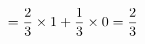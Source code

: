 \documentclass[preview]{standalone}
\begin{document}
\begin{align*}
\special{dvisvgm:raw <g id='unique000'>}=\dfrac{2}{3}\times 1+\dfrac{1}{3}\times 0=\dfrac{2}{3}\special{dvisvgm:raw </g>}
\end{align*}
\end{document}
